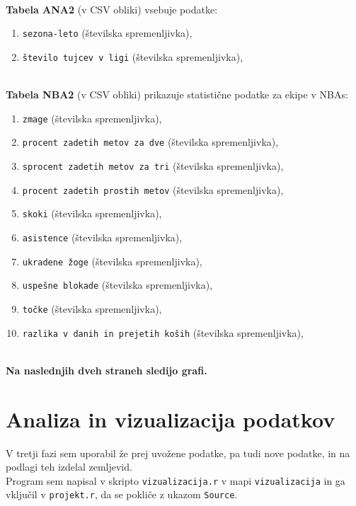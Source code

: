 \documentclass[11pt,a4paper]{article}
\begin{document}
\\
\textbf{Tabela ANA2} (v CSV obliki) vsebuje podatke:
\begin{enumerate}
\item{\verb|sezona-leto| (številska spremenljivka),}
\item{\verb|število tujcev v ligi| (številska spremenljivka),}
\end{enumerate}
\\


\textbf{Tabela NBA2} (v CSV obliki) prikazuje statistične podatke za ekipe v NBAs:

\begin{enumerate}
\item{\verb|zmage| (številska spremenljivka),}
\item{\verb|procent zadetih metov za dve| (številska spremenljivka),}
\item{\verb|sprocent zadetih metov za tri| (številska spremenljivka),}
\item{\verb|procent zadetih prostih metov| (številska spremenljivka),}
\item{\verb|skoki| (številska spremenljivka),}
\item{\verb|asistence| (številska spremenljivka),}
\item{\verb|ukradene žoge| (številska spremenljivka),}
\item{\verb|uspešne blokade| (številska spremenljivka),}
\item{\verb|točke| (številska spremenljivka),}
\item{\verb|razlika v danih in prejetih koših| (številska spremenljivka),}
\end{enumerate}
\\

\textbf{Na naslednjih dveh straneh sledijo grafi.}





\section{Analiza in vizualizacija podatkov}

V tretji fazi sem uporabil že prej uvožene podatke, pa tudi nove podatke, in na podlagi teh izdelal zemljevid.\\

Program sem napisal v skripto \verb|vizualizacija.r| v mapi \verb|vizualizacija| in ga vključil v \verb|projekt.r|, da se pokliče z ukazom \verb|Source|.\\
\end{document}
